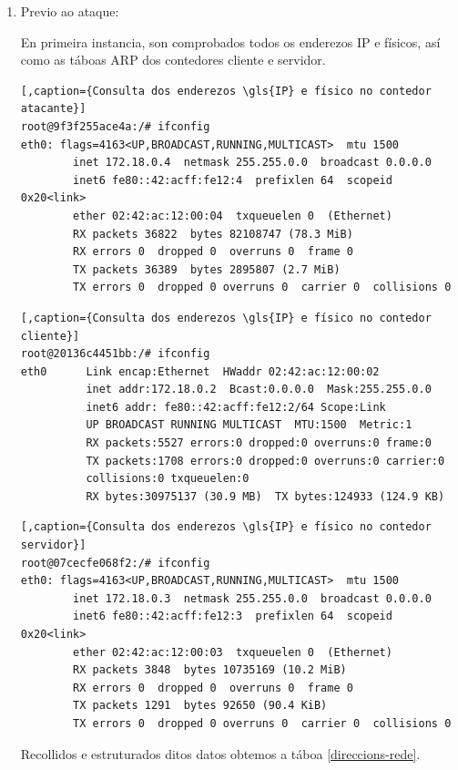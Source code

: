 \begin{enumerate}
\item Previo ao ataque:

En primeira instancia, son comprobados todos os enderezos \gls{IP} e físicos, así como as táboas \gls{ARP} dos contedores cliente e servidor.

\begin{lstlisting}[,caption={Consulta dos enderezos \gls{IP} e físico no contedor atacante}]
root@9f3f255ace4a:/# ifconfig 
eth0: flags=4163<UP,BROADCAST,RUNNING,MULTICAST>  mtu 1500
        inet 172.18.0.4  netmask 255.255.0.0  broadcast 0.0.0.0
        inet6 fe80::42:acff:fe12:4  prefixlen 64  scopeid 0x20<link>
        ether 02:42:ac:12:00:04  txqueuelen 0  (Ethernet)
        RX packets 36822  bytes 82108747 (78.3 MiB)
        RX errors 0  dropped 0  overruns 0  frame 0
        TX packets 36389  bytes 2895807 (2.7 MiB)
        TX errors 0  dropped 0 overruns 0  carrier 0  collisions 0
\end{lstlisting}

\begin{lstlisting}[,caption={Consulta dos enderezos \gls{IP} e físico no contedor cliente}]
root@20136c4451bb:/# ifconfig 
eth0      Link encap:Ethernet  HWaddr 02:42:ac:12:00:02  
          inet addr:172.18.0.2  Bcast:0.0.0.0  Mask:255.255.0.0
          inet6 addr: fe80::42:acff:fe12:2/64 Scope:Link
          UP BROADCAST RUNNING MULTICAST  MTU:1500  Metric:1
          RX packets:5527 errors:0 dropped:0 overruns:0 frame:0
          TX packets:1708 errors:0 dropped:0 overruns:0 carrier:0
          collisions:0 txqueuelen:0 
          RX bytes:30975137 (30.9 MB)  TX bytes:124933 (124.9 KB)
\end{lstlisting}

\begin{lstlisting}[,caption={Consulta dos enderezos \gls{IP} e físico no contedor servidor}]
root@07cecfe068f2:/# ifconfig 
eth0: flags=4163<UP,BROADCAST,RUNNING,MULTICAST>  mtu 1500
        inet 172.18.0.3  netmask 255.255.0.0  broadcast 0.0.0.0
        inet6 fe80::42:acff:fe12:3  prefixlen 64  scopeid 0x20<link>
        ether 02:42:ac:12:00:03  txqueuelen 0  (Ethernet)
        RX packets 3848  bytes 10735169 (10.2 MiB)
        RX errors 0  dropped 0  overruns 0  frame 0
        TX packets 1291  bytes 92650 (90.4 KiB)
        TX errors 0  dropped 0 overruns 0  carrier 0  collisions 0
\end{lstlisting}

Recollidos e estruturados ditos datos obtemos a táboa \ref{direccions-rede}.


\end{enumerate}
